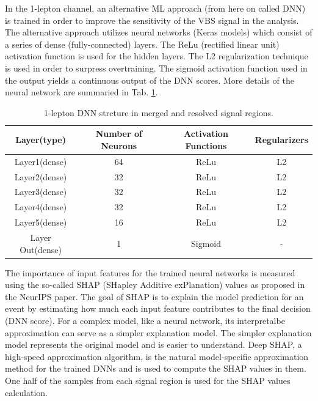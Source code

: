In the 1-lepton channel, an alternative ML approach (from here on called DNN) is trained in order to improve the sensitivity of the VBS signal in the analysis. The alternative approach utilizes neural networks (Keras models) which consist of a series of dense (fully-connected) layers. The ReLu (rectified linear unit) activation function is used for the hidden layers. The L2 regularization technique is used in order to surpress
overtraining. The sigmoid activation function used in the output yields a continuous output of the DNN scores.
More details of the neural network are summaried in Tab. \ref{tab:1lepDNN layers}.

\begin{table}[ht]
    \centering
    \begin{tabular}{c|c|c|c}
     Layer(type) & Number of Neurons & Activation Functions & Regularizers\\
     \hline
     \hline
     Layer1(dense) & 64 & ReLu & L2\\
     Layer2(dense) & 32 & ReLu & L2\\
     Layer3(dense) & 32 & ReLu & L2\\
     Layer4(dense) & 32 & ReLu & L2\\
     Layer5(dense) & 16 & ReLu & L2\\
     Layer Out(dense) & 1 & Sigmoid & -\\
    \end{tabular}
    \caption{1-lepton DNN strcture in merged and resolved signal regions.}
    \label{tab:1lepDNN layers}
\end{table}

The importance of input features for the trained neural networks is measured using the so-called SHAP (SHapley Additive exPlanation) values as proposed in the NeurIPS paper. 
The goal of SHAP is to explain the model prediction for an event by estimating how much each input feature contributes to the final decision (DNN score).
For a complex model, like a neural network, its interpretalbe approximation can serve as a simpler explanation model. The simpler explanation model represents the original model and is easier to understand. 
Deep SHAP, a high-speed approximation algorithm, is the natural model-specific approximation method for the trained DNNs and is used to compute the SHAP values in them. 
One half of the samples from each signal region is used for the SHAP values calculation.

